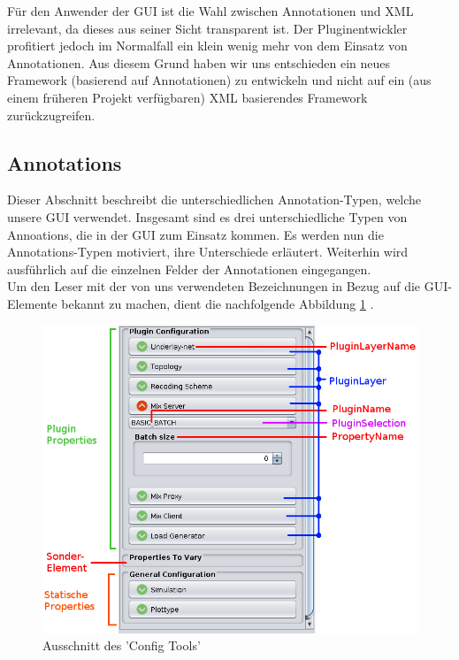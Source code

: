 \documentclass[a4paper, 11pt]{article} %
\begin{document}
Für den Anwender der GUI ist die Wahl zwischen Annotationen und XML irrelevant, da dieses aus seiner Sicht transparent ist. Der Pluginentwickler profitiert jedoch im Normalfall ein klein wenig mehr von dem Einsatz von Annotationen. Aus diesem Grund haben wir uns entschieden ein neues Framework (basierend auf Annotationen) zu entwickeln und nicht auf ein (aus einem früheren Projekt verfügbaren) XML basierendes Framework zurückzugreifen.



\newpage
\subsection{Annotations} %
\label{sub:annotations}
Dieser Abschnitt beschreibt die unterschiedlichen Annotation-Typen, welche unsere GUI verwendet. Insgesamt sind es drei unterschiedliche Typen von Annoations, die in der GUI zum Einsatz kommen. Es werden nun die Annotations-Typen motiviert, ihre Unterschiede erläutert. Weiterhin wird ausführlich auf die einzelnen Felder der Annotationen eingegangen.\\

Um den Leser mit der von uns verwendeten Bezeichnungen in Bezug auf die GUI-Elemente bekannt zu machen, dient die nachfolgende Abbildung \ref{fig:guielements} . 

\begin{figure}[!htp]

\includegraphics[scale=0.56]{img/configtool_edit.png}

\caption{Ausschnitt des 'Config Tools'}
\label{fig:guielements}
\end{figure}
\end{document}
